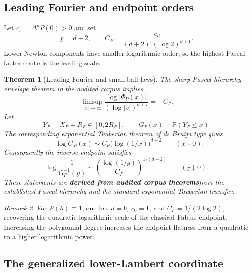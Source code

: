 \documentclass[11pt,oneside]{article}
\numberwithin{equation}{section}
\newtheorem{theorem}{Theorem}[section]
\theoremstyle{definition}
\theoremstyle{remark}
\newtheorem{remark}[theorem]{Remark}
\newcommand{\Prob}{\mathbb P}
\newcommand{\statusderived}{\textcolor{linkblue}{\textbf{derived from audited corpus theorems}}}
\begin{document}
\subsection{Leading Fourier and endpoint orders}

Let $c_d=\Delta^dP(0)>0$ and set
\begin{equation}
 p=d+2,
 \qquad
 C_P=\frac{c_d}{(d+2)!(\log2)^{d+1}}.
 \label{eq:CP}
\end{equation}
Lower Newton components have smaller logarithmic order, so the highest Pascal factor controls
the leading scale.

\begin{theorem}[Leading Fourier and small-ball laws]
\label{thm:leading-laws}
The sharp Pascal-hierarchy envelope theorem in the audited corpus implies
\begin{equation}
 \limsup_{|x|\to\infty}
 \frac{\log|\Phi_P(x)|}{(\log|x|)^{d+2}}
 =-C_P.
 \label{eq:fourier-leading-P}
\end{equation}
Let
\[
 Y_P=X_P+R_P\in[0,2R_P],
 \qquad
 G_P(x)=\Prob(Y_P\le x).
\]
The corresponding exponential Tauberian theorem of de Bruijn type
\cite{debruijn1959,voss2009} gives
\begin{equation}
 -\log G_P(x)
 \sim C_P\bigl(\log(1/x)\bigr)^{d+2}
 \qquad(x\downarrow0).
 \label{eq:smallball-leading-P}
\end{equation}
Consequently the inverse endpoint satisfies
\begin{equation}
 \boxed{
 \log\frac1{G_P^{-1}(y)}
 \sim
 \left(\frac{\log(1/y)}{C_P}\right)^{1/(d+2)}
 \qquad(y\downarrow0).}
 \label{eq:inverse-leading-P}
\end{equation}
These statements are \statusderived from the established Pascal hierarchy and the standard
exponential Tauberian transfer.
\end{theorem}

\begin{remark}
For $P(h)\equiv1$, one has $d=0$, $c_0=1$, and
$C_P=1/(2\log2)$, recovering the quadratic logarithmic scale of the classical Fabius
endpoint.  Increasing the polynomial degree increases the endpoint flatness from a quadratic
to a higher logarithmic power.
\end{remark}

\subsection{The generalized lower-Lambert coordinate}
\end{document}
